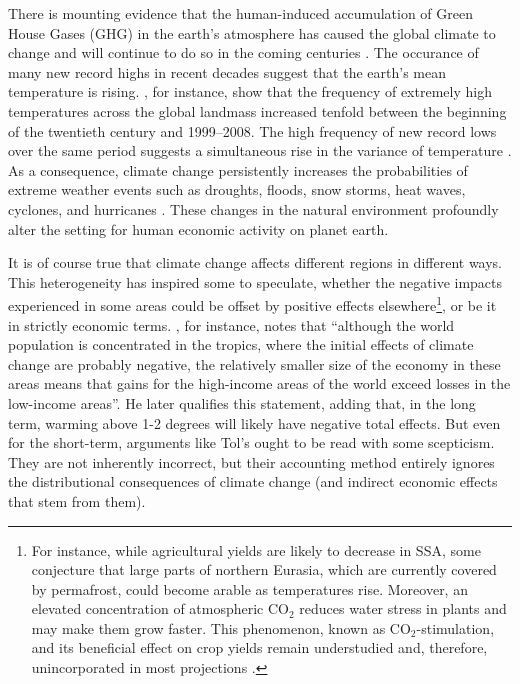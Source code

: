 \documentclass[a4paper,12pt]{article}
\theoremstyle{plain}
\theoremstyle{definition}
\theoremstyle{definition}
\theoremstyle{definition}
\theoremstyle{definition}
\begin{document}
There is mounting evidence that the human-induced accumulation of Green House Gases (GHG) in the earth's atmosphere has caused the global climate to change and will continue to do so in the coming centuries \citep{Pachauri2014}. The occurance of many new record highs in recent decades suggest that the earth's mean temperature is rising. \citet{Munasinghe2012}, for instance, show that the frequency of extremely high temperatures across the global landmass increased tenfold between the beginning of the twentieth century and 1999–2008. The high frequency of new record lows over the same period suggests a simultaneous rise in the variance of temperature \citep{Auffhammer2014a}. As a consequence, climate change persistently increases the probabilities of extreme weather events such as droughts, floods, snow storms, heat waves, cyclones, and hurricanes \citep{Pachauri2014}. These changes in the natural environment profoundly alter the setting for human economic activity on planet earth.

It is of course true that climate change affects different regions in different ways. This heterogeneity has inspired some to speculate, whether the negative impacts experienced in some areas could be offset by positive effects elsewhere\footnote{For instance, while agricultural yields are likely to decrease in SSA, some conjecture that large parts of northern Eurasia, which are currently covered by permafrost, could become arable as temperatures rise. Moreover, an elevated concentration of atmospheric CO$_2$ reduces water stress in plants and may make them grow faster. This phenomenon, known as CO$_2$-stimulation, and its beneficial effect on crop yields remain understudied and, therefore, unincorporated in most projections \citep[e.g., in][]{Schlenker2010}.}, or be it in strictly economic terms. \citeauthor[][p. 34]{Tol2009}, for instance, notes that ``although the world population is concentrated in the tropics, where the initial effects of climate change are probably negative, the relatively smaller size of the economy in these areas means that gains for the high-income areas of the world exceed losses in the low-income areas''. He later qualifies this statement, adding that, in the long term, warming above 1-2 degrees will likely have negative total effects. But even for the short-term, arguments like Tol's ought to be read with some scepticism. They are not inherently incorrect, but their accounting method entirely ignores the distributional consequences of climate change (and indirect economic effects that stem from them).
\end{document}
